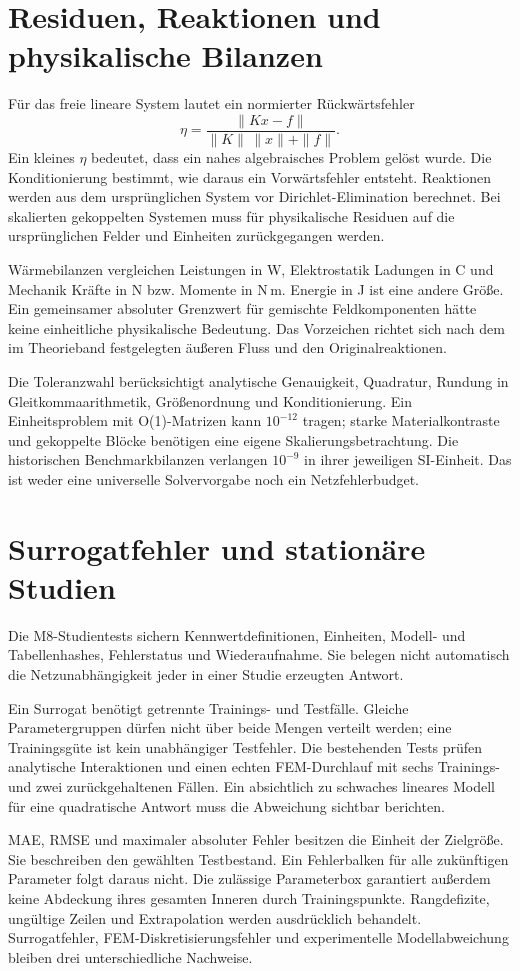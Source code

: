 \section{Residuen, Reaktionen und physikalische Bilanzen}
Für das freie lineare System lautet ein normierter Rückwärtsfehler
\begin{equation}
 \eta=\frac{\|Kx-f\|}{\|K\|\,\|x\|+\|f\|}.
\end{equation}
Ein kleines $\eta$ bedeutet, dass ein nahes algebraisches Problem gelöst wurde.
Die Konditionierung bestimmt, wie daraus ein Vorwärtsfehler entsteht.
Reaktionen werden aus dem ursprünglichen System vor Dirichlet-Elimination
berechnet. Bei skalierten gekoppelten Systemen muss für physikalische Residuen
auf die ursprünglichen Felder und Einheiten zurückgegangen werden.

Wärmebilanzen vergleichen Leistungen in W, Elektrostatik Ladungen in C und
Mechanik Kräfte in N bzw. Momente in N\,m. Energie in J ist eine andere Größe.
Ein gemeinsamer absoluter Grenzwert für gemischte Feldkomponenten hätte keine
einheitliche physikalische Bedeutung. Das Vorzeichen richtet sich nach dem
im Theorieband festgelegten äußeren Fluss und den Originalreaktionen.

Die Toleranzwahl berücksichtigt analytische Genauigkeit, Quadratur,
Rundung in Gleitkommaarithmetik, Größenordnung und Konditionierung. Ein Einheitsproblem mit
O(1)-Matrizen kann $10^{-12}$ tragen; starke Materialkontraste und gekoppelte
Blöcke benötigen eine eigene Skalierungsbetrachtung. Die historischen
Benchmarkbilanzen verlangen $10^{-9}$ in ihrer jeweiligen SI-Einheit.
Das ist weder eine universelle Solvervorgabe noch ein Netzfehlerbudget.

\section{Surrogatfehler und stationäre Studien}
Die M8-Studientests sichern Kennwertdefinitionen, Einheiten, Modell- und
Tabellenhashes, Fehlerstatus und Wiederaufnahme. Sie belegen nicht automatisch
die Netzunabhängigkeit jeder in einer Studie erzeugten Antwort.

Ein Surrogat benötigt getrennte Trainings- und Testfälle. Gleiche
Parametergruppen dürfen nicht über beide Mengen verteilt werden; eine
Trainingsgüte ist kein unabhängiger Testfehler. Die bestehenden Tests prüfen
analytische Interaktionen und einen echten FEM-Durchlauf mit sechs Trainings-
und zwei zurückgehaltenen Fällen. Ein absichtlich zu schwaches lineares Modell
für eine quadratische Antwort muss die Abweichung sichtbar berichten.

MAE, RMSE und maximaler absoluter Fehler besitzen die Einheit der Zielgröße.
Sie beschreiben den gewählten Testbestand. Ein Fehlerbalken für alle zukünftigen
Parameter folgt daraus nicht. Die zulässige Parameterbox garantiert außerdem
keine Abdeckung ihres gesamten Inneren durch Trainingspunkte.
Rangdefizite, ungültige Zeilen und Extrapolation werden ausdrücklich behandelt.
Surrogatfehler, FEM-Diskretisierungsfehler und experimentelle Modellabweichung
bleiben drei unterschiedliche Nachweise.
